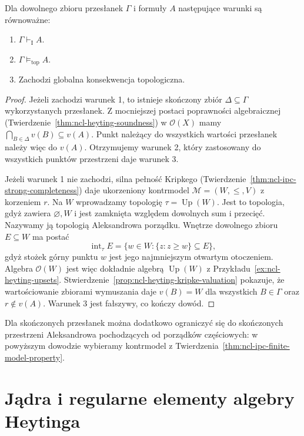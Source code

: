 \begin{twierdzenie}
\label{thm:ncl-heyting-topological-completeness}
Dla dowolnego zbioru przesłanek $\Gamma$ i formuły $A$
następujące warunki są równoważne:
\begin{enumerate}
\item $\Gamma\vdash_{\mathrm I}A$.
\item $\Gamma\models_{\mathrm{top}}A$.
\item Zachodzi globalna konsekwencja topologiczna.
\end{enumerate}
\end{twierdzenie}
\begin{proof}
Jeżeli zachodzi warunek 1, to istnieje skończony
zbiór $\Delta\subseteq\Gamma$ wykorzystanych
przesłanek. Z mocniejszej postaci poprawności
algebraicznej
(Twierdzenie~\ref{thm:ncl-heyting-soundness})
w $\mathcal O(X)$ mamy
$\bigcap_{B\in\Delta}v(B)\subseteq v(A)$.
Punkt należący do wszystkich wartości przesłanek
należy więc do $v(A)$. Otrzymujemy warunek 2,
który zastosowany do wszystkich punktów przestrzeni
daje warunek 3.

Jeżeli warunek 1 nie zachodzi, silna pełność Kripkego
(Twierdzenie~\ref{thm:ncl-ipc-strong-completeness})
daje ukorzeniony kontrmodel $\mathcal M=(W,\leq,V)$
z korzeniem $r$.
Na $W$ wprowadzamy topologię
$\tau=\operatorname{Up}(W)$.
Jest to topologia, gdyż zawiera $\varnothing,W$
i jest zamknięta względem dowolnych sum i przecięć.
Nazywamy ją topologią Aleksandrowa porządku.
Wnętrze dowolnego zbioru $E\subseteq W$ ma postać
\[
 \operatorname{int}_{\tau} E
 =\{w\in W:\{z:z\geq w\}\subseteq E\},
\]
gdyż stożek górny punktu $w$ jest jego najmniejszym
otwartym otoczeniem.
Algebra $\mathcal O(W)$ jest więc dokładnie
algebrą $\operatorname{Up}(W)$ z
Przykładu~\ref{ex:ncl-heyting-upsets}.
Stwierdzenie~\ref{prop:ncl-heyting-kripke-valuation}
pokazuje, że wartościowanie zbiorami wymuszania
daje $v(B)=W$ dla wszystkich $B\in\Gamma$
oraz $r\notin v(A)$.
Warunek 3 jest fałszywy, co kończy dowód.
\end{proof}
Dla skończonych przesłanek można dodatkowo
ograniczyć się do skończonych przestrzeni
Aleksandrowa pochodzących od porządków częściowych:
w powyższym dowodzie wybieramy kontrmodel z
Twierdzenia~\ref{thm:ncl-ipc-finite-model-property}.

\section{Jądra i regularne elementy algebry Heytinga}

